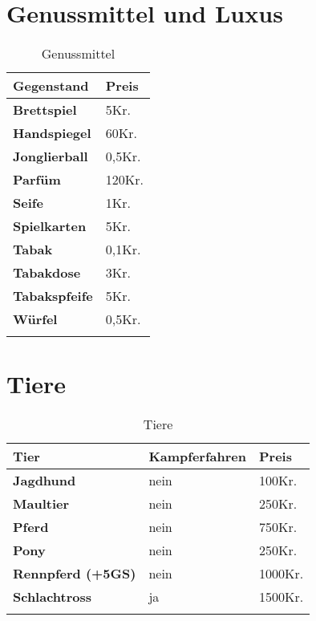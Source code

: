 \section{Genussmittel und Luxus}
\begin{longtable}{|p{5cm}|p{2cm}|}
\hline
\textbf{Gegenstand} & \textbf{Preis} \\ \hline
\textbf{Brettspiel} & 5Kr. \\ \hline
\textbf{Handspiegel} & 60Kr. \\ \hline
\textbf{Jonglierball} & 0,5Kr. \\ \hline
\textbf{Parfüm} & 120Kr. \\ \hline
\textbf{Seife} & 1Kr. \\ \hline
\textbf{Spielkarten} & 5Kr. \\ \hline
\textbf{Tabak} & 0,1Kr. \\ \hline
\textbf{Tabakdose} & 3Kr. \\ \hline
\textbf{Tabakspfeife} & 5Kr. \\ \hline
\textbf{Würfel} & 0,5Kr. \\ \hline

\caption{Genussmittel}
\label{tab:Genussmittel}
\end{longtable}


\section{Tiere}
\begin{longtable}{|p{5cm}|p{4cm}|p{2cm}|}
\hline
\textbf{Tier} & \textbf{Kampferfahren} & \textbf{Preis} \\ \hline
\textbf{Jagdhund} & nein & 100Kr. \\ \hline
\textbf{Maultier} & nein & 250Kr. \\ \hline
\textbf{Pferd} & nein & 750Kr. \\ \hline
\textbf{Pony} & nein & 250Kr. \\ \hline
\textbf{Rennpferd (+5GS)} & nein & 1000Kr. \\ \hline
\textbf{Schlachtross} & ja & 1500Kr. \\ \hline

\caption{Tiere}
\label{tab:Tiere}
\end{longtable}



